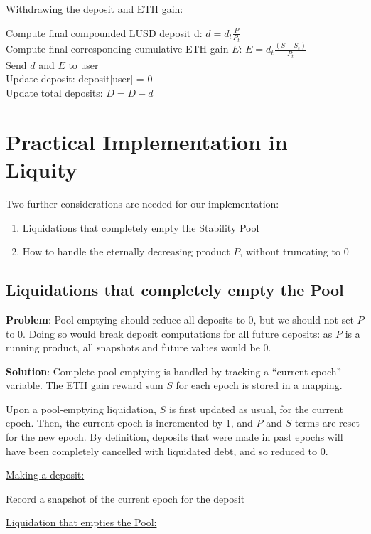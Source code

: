 \documentclass[reqno]{article}
\begin{document}
\bigskip
\underline{Withdrawing the deposit and ETH gain:}

Compute final compounded LUSD deposit d: {$d = d_t\frac{P}{P_t}$}\\
Compute final corresponding cumulative ETH gain $E$: {$E = d_t\frac{(S - S_t)}{P_t}$}\\
Send {$d$} and {$E$} to user\\
Update deposit: deposit[user] = 0\\
Update total deposits: {$D = D - d$}\\

\bigskip
\section{Practical Implementation in Liquity}
Two further considerations are needed for our implementation:
\begin{enumerate}
    \item Liquidations that completely empty the Stability Pool
    \item How to handle the eternally decreasing product {$P$}, without truncating to 0
\end{enumerate}

\bigskip
\subsection{Liquidations that completely empty the Pool}

\bigskip
\textbf{Problem}: Pool-emptying should reduce all deposits to 0, but we should not set {$P$} to 0. Doing so would break deposit computations for all future deposits: as {$P$} is a running product, all snapshots and future values would be 0.

\bigskip
\textbf{Solution}: Complete pool-emptying is handled by tracking a “current epoch” variable. The ETH gain reward sum {$S$} for each epoch is stored in a mapping.

\bigskip
Upon a pool-emptying liquidation, {$S$} is first updated as usual, for the current epoch. Then, the current epoch is incremented by 1, and {$P$} and {$S$} terms are reset for the new epoch. By definition, deposits that were made in past epochs will have been completely cancelled with liquidated debt, and so reduced to 0.

\bigskip
\underline{Making a deposit:}

Record a snapshot of the current epoch for the deposit

\bigskip
\underline{Liquidation that empties the Pool:}
\end{document}
